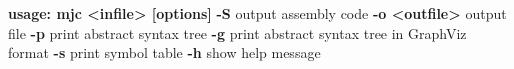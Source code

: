     \textbf{usage: mjc <infile> [options]}
     \textbf{-S}             output assembly code
     \textbf{-o <outfile>}   output file
     \textbf{-p}             print abstract syntax tree
     \textbf{-g}             print abstract syntax tree in GraphViz format
     \textbf{-s}             print symbol table
     \textbf{-h}             show help message
